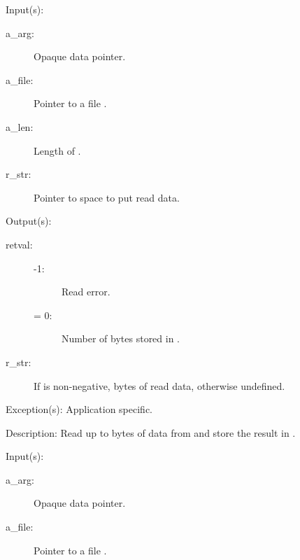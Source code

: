 \begin{capi}
\label{cw_nxo_file_read_t}
	\begin{capilist}
	\item[Input(s): ]
		\begin{description}\item[]
		\item[a\_arg: ]
			Opaque data pointer.
		\item[a\_file: ]
			Pointer to a file .
		\item[a\_len: ]
			Length of .
		\item[r\_str: ]
			Pointer to space to put read data.
		\end{description}
	\item[Output(s): ]
		\begin{description}\item[]
		\item[retval: ]
			\begin{description}\item[]
			\item[-1: ]
				Read error.
			\item[{\gt}= 0: ]
				Number of bytes stored in .
			\end{description}
		\item[r\_str: ]
			If  is non-negative,  bytes of
			read data, otherwise undefined.
		\end{description}
	\item[Exception(s): ] Application specific.
	\item[Description: ]
		Read up to  bytes of data from  and
		store the result in .
	\end{capilist}
\label{cw_nxo_file_write_t}
	\begin{capilist}
	\item[Input(s): ]
		\begin{description}\item[]
		\item[a\_arg: ]
			Opaque data pointer.
		\item[a\_file: ]
			Pointer to a file \classname{nxo}.

\end{description}
\end{capilist}
\end{capi}
